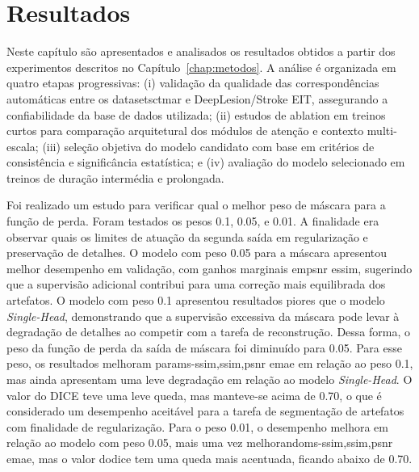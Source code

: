 \chapter{Resultados}
\label{chap:resultados}
Neste capítulo são apresentados e analisados os resultados obtidos a partir dos experimentos descritos no Capítulo~\ref{chap:metodos}. A análise é organizada em quatro etapas progressivas: (i) validação da qualidade das correspondências automáticas entre os datasets\acrshort{ctmar} e DeepLesion/Stroke EIT, assegurando a confiabilidade da base de dados utilizada; (ii) estudos de ablation em treinos curtos para comparação arquitetural dos módulos de atenção e contexto multi-escala; (iii) seleção objetiva do modelo candidato com base em critérios de consistência e significância estatística; e (iv) avaliação do modelo selecionado em treinos de duração intermédia e prolongada.

Foi realizado um estudo para verificar qual o melhor peso de máscara para a função de perda. Foram testados os pesos 0.1, 0.05, e 0.01. A finalidade era observar quais os limites de atuação da segunda saída em regularização e preservação de detalhes. O modelo com peso 0.05 para a máscara apresentou melhor desempenho em validação, com ganhos marginais em\acrshort{psnr} e\acrshort{ssim}, sugerindo que a supervisão adicional contribui para uma correção mais equilibrada dos artefatos. O modelo com peso 0.1 apresentou resultados piores que o modelo \textit{Single-Head}, demonstrando que a supervisão excessiva da máscara pode levar à degradação de detalhes ao competir com a tarefa de reconstrução. Dessa forma, o peso da função de perda da saída de máscara foi diminuído para 0.05. Para esse peso, os resultados melhoram para\acrshort{ms-ssim},\acrshort{ssim},\acrshort{psnr} e\acrfull{mae} em relação ao peso 0.1, mas ainda apresentam uma leve degradação em relação ao modelo \textit{Single-Head}. O valor do DICE teve uma leve queda, mas manteve-se acima de 0.70, o que é considerado um desempenho aceitável para a tarefa de segmentação de artefatos com finalidade de regularização. Para o peso 0.01, o desempenho melhora em relação ao modelo com peso 0.05, mais uma vez melhorando\acrshort{ms-ssim},\acrshort{ssim},\acrshort{psnr} e\acrshort{mae}, mas o valor do\Acrfull{dice} tem uma queda mais acentuada, ficando abaixo de 0.70.

